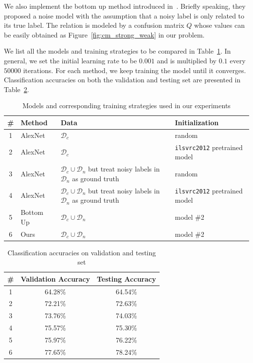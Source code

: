 \documentclass[10pt,twocolumn,letterpaper]{article}
\begin{document}
We also implement the bottom up method introduced in~\cite{sukhbaatar2014learning}. Briefly speaking, they proposed a noise model with the assumption that a noisy label is only related to its true label. The relation is modeled by a confusion matrix $Q$ whose values can be easily obtained as Figure~\ref{fig:cm_strong_weak} in our problem.

We list all the models and training strategies to be compared in Table~\ref{tab:models}.  In general, we set the initial learning rate to be $0.001$ and is multiplied by $0.1$ every $50000$ iterations. For each method, we keep training the model until it converges. Classification accuracies on both the validation and testing set are presented in Table~\ref{tab:accuracy}.

\begin{table}
\begin{center}
\begin{tabular}{c|p{3.5em}|p{8em}|p{6em}}
\hline
\# & Method & Data & Initialization \\
\hline\hline
1 & AlexNet & $\mathcal{D}_c$ & random \\
\hline
2 & AlexNet & $\mathcal{D}_c$ & \texttt{ilsvrc2012} pretrained model \\
\hline
3 & AlexNet & $\mathcal{D}_c \cup \mathcal{D}_n$ but treat noisy labels in $\mathcal{D}_n$ as ground truth & random \\
\hline
4 & AlexNet & $\mathcal{D}_c \cup \mathcal{D}_n$ but treat noisy labels in $\mathcal{D}_n$ as ground truth & \texttt{ilsvrc2012} pretrained model \\
\hline
5 & Bottom Up~\cite{sukhbaatar2014learning} & $\mathcal{D}_c \cup \mathcal{D}_n$ & model \#2 \\
\hline
6 & Ours & $\mathcal{D}_c \cup \mathcal{D}_n$ & model \#2 \\
\hline
\end{tabular}
\end{center}
\caption{Models and corresponding training strategies used in our experiments}
\label{tab:models}
\end{table}

\begin{table}
\begin{center}
\begin{tabular}{c|c|c}
\hline
\# & Validation Accuracy & Testing Accuracy \\
\hline\hline
1 & 64.28\% & 64.54\% \\
\hline
2 & 72.21\% & 72.63\% \\
\hline
3 & 73.76\% & 74.03\% \\
\hline
4 & 75.57\% & 75.30\% \\
\hline
5 & 75.97\% & 76.22\% \\
\hline
6 & 77.65\% & 78.24\% \\
\hline
\end{tabular}
\end{center}
\caption{Classification accuracies on validation and testing set}
\label{tab:accuracy}
\end{table}
\end{document}
